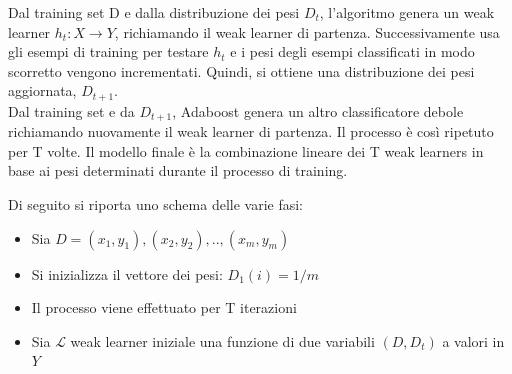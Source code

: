 \newpage
\vspace{1.5cm}


Dal training set D e dalla 
distribuzione dei pesi
 {\begin{math} D_t \end{math}}, l'algoritmo genera 
 un weak learner {\begin{math} h_t:X \to Y \end{math}}, richiamando il weak learner
di partenza. Successivamente usa gli esempi di training per testare {\begin{math} h_t \end{math}} e i pesi degli esempi classificati in modo scorretto vengono
incrementati. Quindi, si ottiene una distribuzione dei pesi aggiornata, {\begin{math} D_{t+1} \end{math}}.\\
 Dal training set e da {\begin{math} D_{t+1} \end{math}},
Adaboost genera un altro classificatore debole richiamando nuovamente il weak learner di partenza. Il processo \`e cos\`i ripetuto per T volte. 
Il modello finale \`e la combinazione lineare dei T weak learners in base ai pesi determinati durante il processo di training.\\
\newline

Di seguito si riporta uno schema delle varie fasi:\\
\newline
\begin{itemize}
\item Sia {\begin{math}D = (x_1,y_1),(x_2,y_2),..,(x_m,y_m)\end{math}}
\item Si inizializza il vettore dei pesi: \begin{math} D_1(i)=1/m \end{math}
\item Il processo viene effettuato per T iterazioni 
\item Sia \begin{math} \mathcal{L} \end{math} weak learner iniziale una funzione di due variabili  \begin{math}(D,D_t)\end{math} a valori in {\begin{math}Y \end{math}}
\end{itemize}

